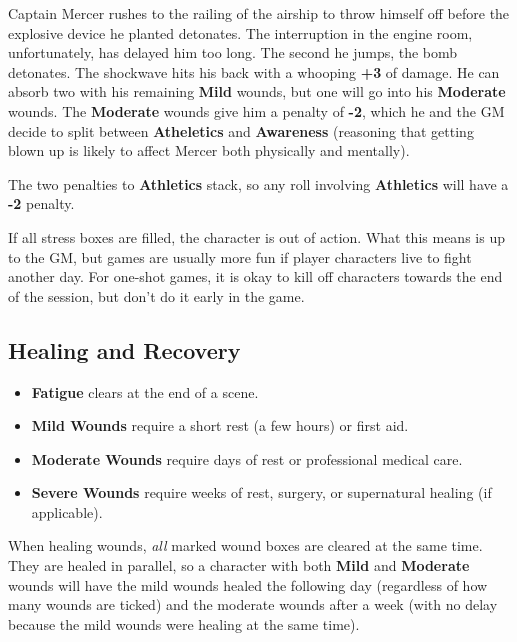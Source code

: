 \begin{Example}
	Captain Mercer rushes to the railing of the airship to throw himself off before the explosive device he planted detonates. The interruption in the engine room, unfortunately, has delayed him too long. The second he jumps, the bomb detonates. The shockwave hits his back with a whooping \textbf{+3} of damage. He can absorb two with his remaining \textbf{Mild} wounds, but one will go into his \textbf{Moderate} wounds. The \textbf{Moderate} wounds give him a penalty of \textbf{-2}, which he and the GM decide to split between \textbf{Atheletics} and \textbf{Awareness} (reasoning that getting blown up is likely to affect Mercer both physically and mentally).
	
	\vspace{0.5\baselineskip}
	\DamageBox[%
		fatigue=4,%
		mild=3,%
		mildtext=\textbf{Athletics (-1)},%
		moderate=1,%
		moderatetext=\textbf{Athletics (-1), Awareness (-1)}%
	]
	
	\noindent
	The two penalties to \textbf{Athletics} stack, so any roll involving \textbf{Athletics} will have a \textbf{-2} penalty.
\end{Example}

If all stress boxes are filled, the character is out of action. What this means is up to the GM, but games are usually more fun if player characters live to fight another day. For one-shot games, it is okay to kill off characters towards the end of the session, but don't do it early in the game.


\subsection{Healing and Recovery}\label{core:healing}

\begin{itemize}
    \item \textbf{Fatigue} clears at the end of a scene.
    \item \textbf{Mild Wounds} require a short rest (a few hours) or first aid.
    \item \textbf{Moderate Wounds} require days of rest or professional medical care.
    \item \textbf{Severe Wounds} require weeks of rest, surgery, or supernatural healing (if applicable).
\end{itemize}

When healing wounds, \emph{all} marked wound boxes are cleared at the same time. They are healed in parallel, so a character with both \textbf{Mild} and \textbf{Moderate} wounds will have the mild wounds healed the following day (regardless of how many wounds are ticked) and the moderate wounds after a week (with no delay because the mild wounds were healing at the same time).

